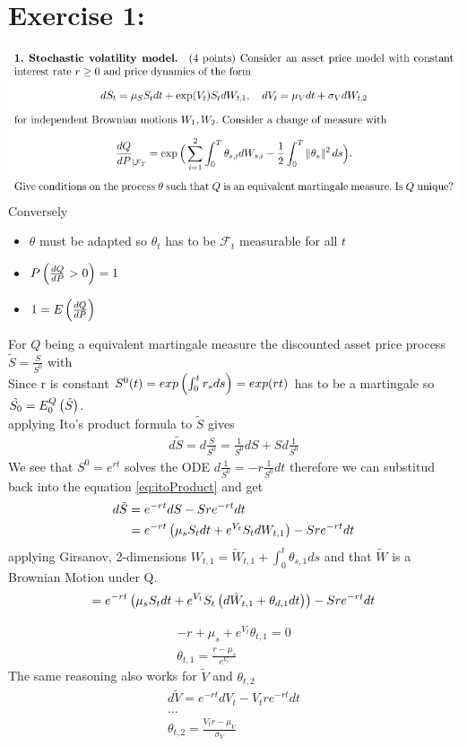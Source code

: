 \documentclass[document.tex]{subfiles}
\begin{document}
\section*{Exercise 1:}

\includegraphics[width=\textwidth]{ex1.png}
Conversely 
\begin{itemize}
	\item $\theta$ must be adapted so $\theta_t$ has to be  $\mathcal{F}_t$ measurable for all $t$ \\ 
	\item $P \left( \frac{dQ}{dP} > 0 \right) =1 $
	\item $1 = E \left( \frac{dQ}{dP} \right)$ 
\end{itemize}

For $Q$ being a equivalent martingale measure the discounted asset price process $\tilde{S} = \frac{S}{S^0}$ with \\ 
Since r is constant $S^0 (t) = exp \left( \int_0^t r_s ds \right) = exp(rt)$  has to be a martingale so $\tilde{S_0}= E^Q_0 \left( \tilde{S} \right)$.\\

applying Ito's product formula to $\tilde{S}$ gives
\begin{align}
	d \tilde{S} = d \frac{S}{S^0}
	= \frac{1}{S^0} d S + S d \frac{1}{S^0}  \label{eq:itoProduct}
  \end{align}
We see that $S^0=e^{rt}$ solves the ODE $d \frac{1}{S^0}=-r \frac{1}{S^0} dt$
therefore we can substitud back into the equation \eqref{eq:itoProduct} and get
\begin{align}
	d \tilde{S} &= e^{-rt} d S - S r e^{-rt} dt \\
	&= e^{-rt} \left( \mu_s S_t dt + e^{V_t} S_t dW_{t,1} \right)  - S r e^{-rt} dt 
\end{align}
applying Girsanov, 2-dimensions $W_{t,1} = \tilde{W}_{t,1} + \int_0^t \theta_{s,1} ds$ and that $\tilde{W}$ is a Brownian Motion under Q.	
\begin{align}
	= e^{-rt} \left( \mu_s S_t dt + e^{V_t} S_t \left( d\tilde{W}_{t,1} + \theta_{d,1} dt \right) \right)  - S r e^{-rt} dt \\
\end{align}

\begin{align}
	-r + \mu_s + e^{V_t} \theta_{t,1} =0 \\
	\theta_{t,1} = \frac{r-\mu_s}{e^{V_t}}
\end{align}
The same reasoning also works for $\tilde{V}$ and $\theta_{t,2}$
\begin{align*}
	d \tilde{V} = e^{-rt} d V_t - V_t r e^{-rt} dt \\
	\dots \\
	\theta_{t,2} = \frac{V_t r - \mu_V }{\sigma_V}
\end{align*}
\end{document}
